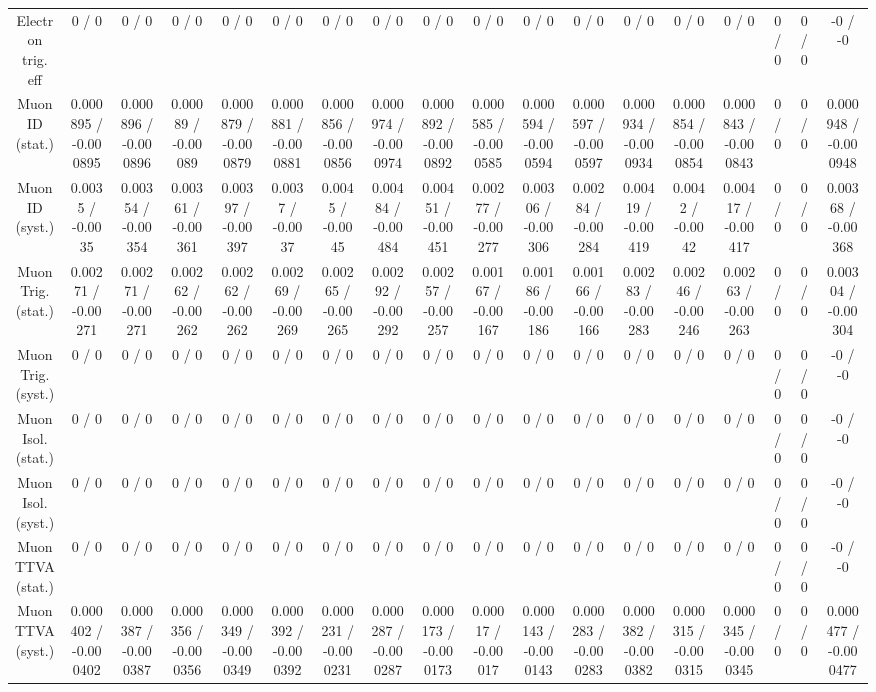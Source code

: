\documentclass[10pt]{article}
\begin{document}
\begin{table}[htbp]
\begin{center}
\begin{tabular}{|c|c|c|c|c|c|c|c|c|c|c|c|c|c|c|c|c|c|}
  Electron trig. eff & 0 / 0 & 0 / 0 & 0 / 0 & 0 / 0 & 0 / 0 & 0 / 0 & 0 / 0 & 0 / 0 & 0 / 0 & 0 / 0 & 0 / 0 & 0 / 0 & 0 / 0 & 0 / 0 & 0 / 0 & 0 / 0 & -0 / -0 \\ 
  Muon ID (stat.) & 0.000895 / -0.000895 & 0.000896 / -0.000896 & 0.00089 / -0.00089 & 0.000879 / -0.000879 & 0.000881 / -0.000881 & 0.000856 / -0.000856 & 0.000974 / -0.000974 & 0.000892 / -0.000892 & 0.000585 / -0.000585 & 0.000594 / -0.000594 & 0.000597 / -0.000597 & 0.000934 / -0.000934 & 0.000854 / -0.000854 & 0.000843 / -0.000843 & 0 / 0 & 0 / 0 & 0.000948 / -0.000948 \\ 
  Muon ID (syst.) & 0.0035 / -0.0035 & 0.00354 / -0.00354 & 0.00361 / -0.00361 & 0.00397 / -0.00397 & 0.0037 / -0.0037 & 0.0045 / -0.0045 & 0.00484 / -0.00484 & 0.00451 / -0.00451 & 0.00277 / -0.00277 & 0.00306 / -0.00306 & 0.00284 / -0.00284 & 0.00419 / -0.00419 & 0.0042 / -0.0042 & 0.00417 / -0.00417 & 0 / 0 & 0 / 0 & 0.00368 / -0.00368 \\ 
  Muon Trig. (stat.) & 0.00271 / -0.00271 & 0.00271 / -0.00271 & 0.00262 / -0.00262 & 0.00262 / -0.00262 & 0.00269 / -0.00269 & 0.00265 / -0.00265 & 0.00292 / -0.00292 & 0.00257 / -0.00257 & 0.00167 / -0.00167 & 0.00186 / -0.00186 & 0.00166 / -0.00166 & 0.00283 / -0.00283 & 0.00246 / -0.00246 & 0.00263 / -0.00263 & 0 / 0 & 0 / 0 & 0.00304 / -0.00304 \\ 
  Muon Trig. (syst.) & 0 / 0 & 0 / 0 & 0 / 0 & 0 / 0 & 0 / 0 & 0 / 0 & 0 / 0 & 0 / 0 & 0 / 0 & 0 / 0 & 0 / 0 & 0 / 0 & 0 / 0 & 0 / 0 & 0 / 0 & 0 / 0 & -0 / -0 \\ 
  Muon Isol. (stat.) & 0 / 0 & 0 / 0 & 0 / 0 & 0 / 0 & 0 / 0 & 0 / 0 & 0 / 0 & 0 / 0 & 0 / 0 & 0 / 0 & 0 / 0 & 0 / 0 & 0 / 0 & 0 / 0 & 0 / 0 & 0 / 0 & -0 / -0 \\ 
  Muon Isol. (syst.) & 0 / 0 & 0 / 0 & 0 / 0 & 0 / 0 & 0 / 0 & 0 / 0 & 0 / 0 & 0 / 0 & 0 / 0 & 0 / 0 & 0 / 0 & 0 / 0 & 0 / 0 & 0 / 0 & 0 / 0 & 0 / 0 & -0 / -0 \\ 
  Muon TTVA (stat.) & 0 / 0 & 0 / 0 & 0 / 0 & 0 / 0 & 0 / 0 & 0 / 0 & 0 / 0 & 0 / 0 & 0 / 0 & 0 / 0 & 0 / 0 & 0 / 0 & 0 / 0 & 0 / 0 & 0 / 0 & 0 / 0 & -0 / -0 \\ 
  Muon TTVA (syst.) & 0.000402 / -0.000402 & 0.000387 / -0.000387 & 0.000356 / -0.000356 & 0.000349 / -0.000349 & 0.000392 / -0.000392 & 0.000231 / -0.000231 & 0.000287 / -0.000287 & 0.000173 / -0.000173 & 0.00017 / -0.00017 & 0.000143 / -0.000143 & 0.000283 / -0.000283 & 0.000382 / -0.000382 & 0.000315 / -0.000315 & 0.000345 / -0.000345 & 0 / 0 & 0 / 0 & 0.000477 / -0.000477 \\ 

\end{tabular}
\end{center}
\end{table}
\end{document}
